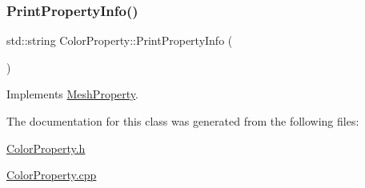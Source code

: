 \subsubsection{\texorpdfstring{PrintPropertyInfo()}{PrintPropertyInfo()}}
{\footnotesize\ttfamily std\+::string Color\+Property\+::\+Print\+Property\+Info (\begin{DoxyParamCaption}{ }\end{DoxyParamCaption})\hspace{0.3cm}{\ttfamily [virtual]}}



Implements \mbox{\hyperlink{class_mesh_property_aecb4479e9430b8071104fbf7dde0b1c5}{Mesh\+Property}}.



The documentation for this class was generated from the following files\+:\begin{DoxyCompactItemize}
\item 
\mbox{\hyperlink{_color_property_8h}{Color\+Property.\+h}}\item 
\mbox{\hyperlink{_color_property_8cpp}{Color\+Property.\+cpp}}\end{DoxyCompactItemize}
